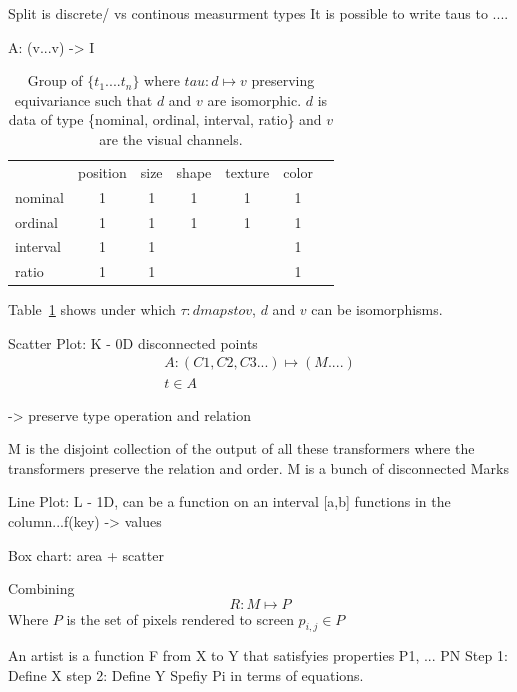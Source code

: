 \documentclass[letterpaper,onecolumn,titlepage]{Ythesis}
\begin{document}
Split is discrete/ vs continous measurment types 
It is possible to write taus to ....

A: (v...v) -> I

\begin{table}
    \label{tab:taus}
    \begin{tabular}{l*{6}{c}} 
                              & position      &  size        & shape        & texture     & color \\
    nominal                   &  1            &  1           & 1            & 1           & 1     \\ 
    ordinal                   &  1            &  1           & 1            & 1           & 1     \\
    interval                  &  1            &  1           &              &             & 1     \\   
    ratio                     &  1            &  1           &              &             & 1     \\  
    \end{tabular}
\caption{Group of $\{t_{1}....t_{n}\}$ where $tau: d \mapsto v$ preserving equivariance such that $d$ and $v$ are isomorphic. $d$ is data of type \{nominal, ordinal, interval, ratio\} and $v$ are the visual channels. \cite{bertinIIPropertiesGraphic2011,munznerMarksChannels}}
\end{table}
 

Table~\ref{tab:taus} shows under which $\tau: d maps to v$, $d$ and $v$ can be isomorphisms.


Scatter Plot:
K - 0D disconnected points
\begin{multline}
A: (C1, C2, C3...)\mapsto (M....)\\
t \in A 
\end{multline}

-> preserve type operation and relation

M is the disjoint collection of the output of all these transformers where the transformers preserve the relation and order. M is a bunch of disconnected Marks

Line Plot:
L - 1D, can be a function on an interval [a,b]
functions in the column...f(key) -> values

Box chart: area + scatter 


Combining 
\begin{equation}
    \label{eg:renderer}
    R: M \mapsto P
\end{equation}
Where $P$ is the set of pixels rendered to screen ${p_{i,j} \in P}$


An artist is a function F from X to Y
that satisfyies properties P1, ... PN
Step 1: Define X
step 2: Define Y
Spefiy Pi in terms of equations.


\printbibliography
\end{document}
